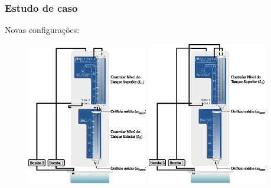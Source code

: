 \documentclass{beamer}
\begin{document}
\begin{frame}
    \frametitle{Estudo de caso}

    Novas configurações:
\begin{figure}[htb]
\centering
\subfigure
{
    \includegraphics[width=0.47\textwidth]{imgs/sistema/eps/nova_config_1}
}
\quad
\subfigure
{
    \includegraphics[width=0.47\textwidth]{imgs/sistema/eps/nova_config_2}
}
\end{figure}
\end{frame}
\end{document}
